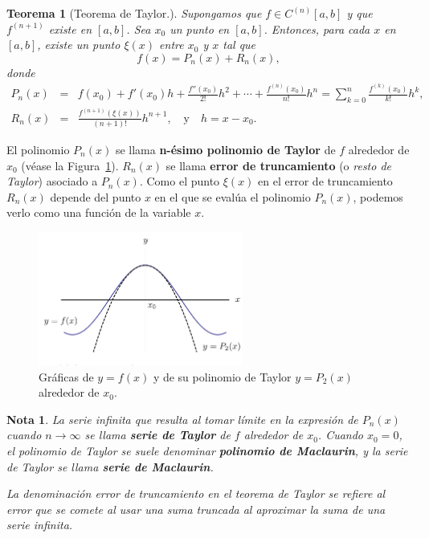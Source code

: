 \documentclass[12pt]{article}
\newtheorem{Note}{Nota}%
\newtheorem{Teo}{Teorema}
\begin{document}
\begin{Teo}[Teorema de Taylor.]
Supongamos que $f \in C^{(n)}[a,b] $ y que $f^{(n+1)} $ existe en $[a,b] $. Sea $x_0 $ un punto en $[a,b] $. Entonces, para cada $x $ en $[a,b] $, existe un punto $\xi(x) $ entre $x_0 $ y $x $ tal que
$$f(x) = P_n(x) + R_n(x),$$
donde
\begin{eqnarray}
P_n(x) &=& f(x_0) + f'(x_0)h + \frac{f''(x_0)}{2!}h^2 + \cdots + \frac{f^{(n)}(x_0)}{n!}h^n = \sum_{k=0}^n \frac{f^{(k)}(x_0)}{k!} h^k,\\
R_n(x)&=& \frac{f^{(n+1)}(\xi(x))}{(n+1)!} h^{n+1}, \quad \text{y} \quad h = x - x_0.
\end{eqnarray}
\end{Teo}


El polinomio $P_n(x) $ se llama \textbf{n-ésimo polinomio de Taylor} de $f $ alrededor de $x_0 $ (véase la Figura~\ref{fig:taylor}).   $R_n(x) $ se llama \textbf{error de truncamiento} (o \textit{resto de Taylor}) asociado a $P_n(x) $.   Como el punto $\xi(x) $ en el error de truncamiento $R_n(x) $ depende del punto $x $ en el que se evalúa el polinomio $P_n(x) $, podemos verlo como una función de la variable $x $.

\begin{figure}[H]
\centering
\includegraphics[width=0.6\textwidth]{Fig5.png}
\caption{Gráficas de $y = f(x) $ y de su polinomio de Taylor $y = P_2(x) $ alrededor de $x_0 $.}
\label{fig:taylor}
\end{figure}

\begin{Note}
La serie infinita que resulta al tomar límite en la expresión de $P_n(x) $ cuando $n \to \infty $ se llama \textbf{serie de Taylor} de $f $ alrededor de $x_0 $. Cuando $x_0 = 0 $, el polinomio de Taylor se suele denominar \textbf{polinomio de Maclaurin}, y la serie de Taylor se llama \textbf{serie de Maclaurin}.\bigskip

La denominación \textit{error de truncamiento} en el teorema de Taylor se refiere al error que se comete al usar una suma truncada al aproximar la suma de una serie infinita.
\end{Note}
\end{document}
